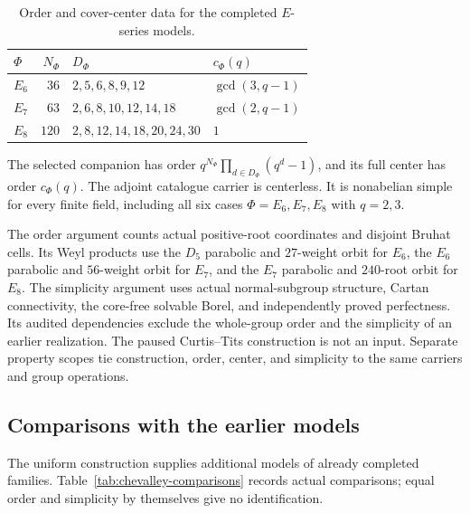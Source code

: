 \documentclass[11pt]{article}
\numberwithin{equation}{section}
\theoremstyle{definition}
\begin{document}
\begin{table}[!htbp]
\centering
\begin{tabular}{@{}lrl l@{}}
\toprule
$\Phi$ & $N_\Phi$ & $D_\Phi$ & $c_\Phi(q)$\\
\midrule
$E_6$ & $36$ & $2,5,6,8,9,12$ & $\gcd(3,q-1)$\\
$E_7$ & $63$ & $2,6,8,10,12,14,18$ & $\gcd(2,q-1)$\\
$E_8$ & $120$ & $2,8,12,14,18,20,24,30$ & $1$\\
\bottomrule
\end{tabular}
\caption{Order and cover-center data for the completed $E$-series models.}
\label{tab:eorders}
\end{table}

The selected companion has order
$q^{N_\Phi}\prod_{d\in D_\Phi}(q^d-1)$, and its full center has order
$c_\Phi(q)$. The adjoint catalogue carrier is centerless. It is
nonabelian simple for every finite field, including all six cases
$\Phi=E_6,E_7,E_8$ with $q=2,3$.

The order argument counts actual positive-root coordinates and disjoint
Bruhat cells. Its Weyl products use the $D_5$ parabolic and $27$-weight
orbit for $E_6$, the $E_6$ parabolic and $56$-weight orbit for $E_7$,
and the $E_7$ parabolic and $240$-root orbit for $E_8$.
The simplicity argument uses actual normal-subgroup structure, Cartan
connectivity, the core-free solvable Borel, and independently proved
perfectness. Its audited dependencies exclude the whole-group order
and the simplicity of an earlier realization. The paused Curtis--Tits
construction is not an input. Separate property scopes tie construction,
order, center, and simplicity to the same carriers and group operations.

\subsection{Comparisons with the earlier models}

The uniform construction supplies additional models of already completed
families. Table~\ref{tab:chevalley-comparisons} records actual comparisons;
equal order and simplicity by themselves give no identification.
\end{document}
